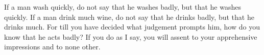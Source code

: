 If a  man wash quickly,  do not say  that he washes  badly, but that  he washes
quickly. If a man drink much wine, do not say that he drinks badly, but that he
drinks much. For till  you have decided what judgement prompts  him, how do you
know  that he  acts  badly?  If you  do  as  I say,  you  will  assent to  your
apprehensive impressions and to none other.
